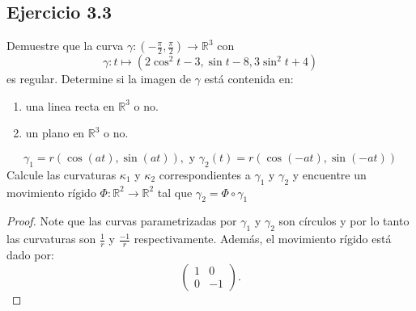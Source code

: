 \documentclass[12pt]{article}
\begin{document}
\subsection*{Ejercicio 3.3}
 Demuestre que la curva $\gamma :(-\frac{\pi}{2},\frac{\pi}{2}) \rightarrow \mathbb{R}^3$ con
\begin{equation*}
   \gamma :t \mapsto (2 \cos^2 t -3 , \sin t - 8 , 3 \sin ^2 t + 4)
\end{equation*}
es regular. Determine si la imagen de $\gamma$ est\'a contenida en:
\begin{enumerate}
  \item una linea recta en $\mathbb{R}^3$ o no.
  \item un plano en $\mathbb{R}^3$ o no.
\end{enumerate}
\begin{equation*}
\gamma_{1}=r(\cos(at),\sin(at)), \text{ y } \gamma_{2}(t)=r(\cos(-at),\sin(-at))
\end{equation*}
Calcule las curvaturas $\kappa_{1}$ y $\kappa_{2}$ correspondientes a $\gamma_{1}$ y  $\gamma_{2}$ y encuentre un movimiento r\'igido $\Phi :\mathbb{R}^2 \rightarrow \mathbb{R}^2$ tal que $\gamma_{2}=\Phi \circ \gamma_{1}$\\
\begin{proof}
Note que las curvas parametrizadas por $\gamma_{1}$ y  $\gamma_{2}$ son c\'irculos y por lo tanto las curvaturas son $\frac{1}{r}$ y $\frac{-1}{r}$ respectivamente. Adem\'as, el movimiento r\'igido est\'a dado por:
\begin{equation*}
\begin{pmatrix} 1 & 0 \\ 0 & -1 \end{pmatrix}.
\end{equation*}
\end{proof}

\end{document}
